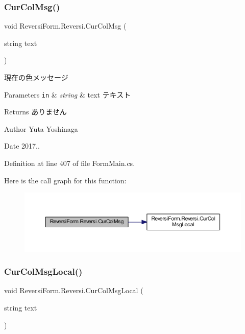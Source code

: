 \subsubsection{\texorpdfstring{Cur\+Col\+Msg()}{CurColMsg()}}
{\footnotesize\ttfamily void Reversi\+Form.\+Reversi.\+Cur\+Col\+Msg (\begin{DoxyParamCaption}\item[{string}]{text }\end{DoxyParamCaption})}



現在の色メッセージ 


\begin{DoxyParams}[1]{Parameters}
\mbox{\tt in}  & {\em string} & text テキスト \\
\hline
\end{DoxyParams}
\begin{DoxyReturn}{Returns}
ありません 
\end{DoxyReturn}
\begin{DoxyAuthor}{Author}
Yuta Yoshinaga 
\end{DoxyAuthor}
\begin{DoxyDate}{Date}
2017.. 
\end{DoxyDate}


Definition at line 407 of file Form\+Main.\+cs.

Here is the call graph for this function\+:
\nopagebreak
\begin{figure}[H]
\begin{center}
\leavevmode
\includegraphics[width=350pt]{class_reversi_form_1_1_reversi_ad09577aef8bf515ee495c82a981dfd7d_cgraph}
\end{center}
\end{figure}
\mbox{\label{class_reversi_form_1_1_reversi_a0d919be21fe5961a177e26b5752320b9}} 
\subsubsection{\texorpdfstring{Cur\+Col\+Msg\+Local()}{CurColMsgLocal()}}
{\footnotesize\ttfamily void Reversi\+Form.\+Reversi.\+Cur\+Col\+Msg\+Local (\begin{DoxyParamCaption}\item[{string}]{text }\end{DoxyParamCaption})}



